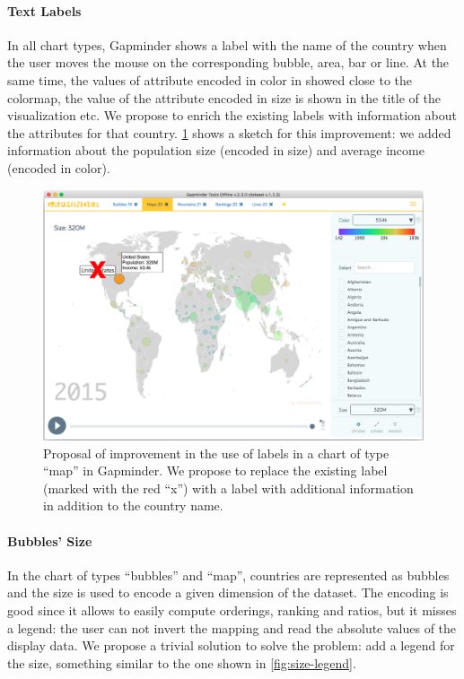 \paragraph{Text Labels}
In all chart types, Gapminder shows a label with the name of the country when the user moves the mouse on the corresponding bubble, area, bar or line.
At the same time, the values of attribute encoded in color in showed close to the colormap, the value of the attribute encoded in size is shown in the title of the visualization etc.
We propose to enrich the existing labels with information about the attributes for that country.
\cref{fig:labels-custom} shows a sketch for this improvement:
we added information about the population size (encoded in size) and average income (encoded in color).

\begin{figure}[h]
	\centering
	\includegraphics[width=0.95\columnwidth]{figures/labels-custom}
	\caption{Proposal of improvement in the use of labels in a chart of type ``map'' in Gapminder. We propose to replace the existing label (marked with the red ``x'') with a label with additional information in addition to the country name.}
	\label{fig:labels-custom}
\end{figure}

\paragraph{Bubbles' Size}
In the chart of types ``bubbles'' and ``map'', countries are represented as bubbles and the size is used to encode a given dimension of the dataset.
The encoding is good since it allows to easily compute orderings, ranking and ratios, but it misses a legend:
the user can not invert the mapping and read the absolute values of the display data.
We propose a trivial solution to solve the problem: add a legend for the size, something similar to the one shown in \cref{fig:size-legend}.

